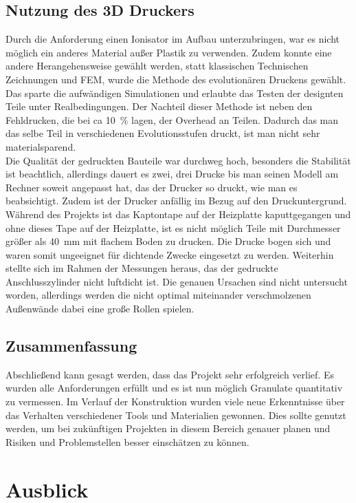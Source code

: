 \subsection{Nutzung des 3D Druckers}

Durch die Anforderung einen Ionisator im Aufbau unterzubringen, war es nicht möglich ein anderes Material außer Plastik zu verwenden. Zudem konnte eine andere Herangehensweise gewählt werden, statt klassischen Technischen Zeichnungen und FEM, wurde die Methode des evolutionären Druckens gewählt. Das sparte die aufwändigen Simulationen und erlaubte das Testen der designten Teile unter Realbedingungen. Der Nachteil dieser Methode ist neben den  Fehldrucken, die bei ca \SI{10}{\%} lagen, der Overhead an Teilen. Dadurch das man das selbe Teil in verschiedenen Evolutionsstufen druckt, ist man nicht sehr materialsparend. \\
Die Qualität der gedruckten Bauteile war durchweg hoch, besonders die Stabilität ist beachtlich, allerdings dauert es zwei, drei Drucke bis man seinen Modell am Rechner soweit angepasst hat, das der Drucker so druckt, wie man es beabsichtigt. Zudem ist der Drucker anfällig im Bezug auf den Druckuntergrund. Während des Projekts ist das Kaptontape auf der Heizplatte kaputtgegangen und ohne dieses Tape auf der Heizplatte, ist es nicht möglich Teile mit Durchmesser größer als \SI{40}{mm} mit flachem Boden zu drucken. Die Drucke bogen sich und waren somit ungeeignet für dichtende Zwecke eingesetzt zu werden. Weiterhin stellte sich im Rahmen der Messungen heraus, das der gedruckte Anschlusszylinder nicht luftdicht ist. Die genauen Ursachen sind nicht untersucht worden, allerdings werden die nicht optimal miteinander verschmolzenen Außenwände dabei eine große Rollen spielen.


\subsection{Zusammenfassung}

Abschließend kann gesagt werden, dass das Projekt sehr erfolgreich verlief. Es wurden alle Anforderungen erfüllt und es ist nun möglich Granulate quantitativ zu vermessen.
Im Verlauf der Konstruktion wurden viele neue Erkenntnisse über das Verhalten verschiedener Tools und Materialien gewonnen. Dies sollte genutzt werden, um bei zukünftigen Projekten in diesem Bereich genauer planen und Risiken und Problemstellen besser einschätzen zu können.




\section{Ausblick}

